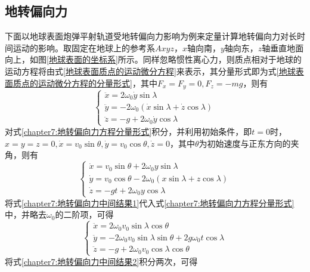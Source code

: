 \subsection{地转偏向力}


下面以地球表面炮弹平射轨道受地转偏向力影响为例来定量计算地转偏向力对长时间运动的影响。取固定在地球上的参考系$Axyz$，$x$轴向南，$y$轴向东，$z$轴垂直地面向上，如图\ref{地球表面的坐标系}所示。同样忽略惯性离心力，则质点相对于地球的运动方程将由式\eqref{地球表面质点的运动微分方程}来表示，其分量形式即为式\eqref{地球表面质点的运动微分方程的分量形式}，其中$F_x=F_y=0, F_z=-mg$，则有
\begin{equation}
\begin{cases}
	\ddot{x} = 2\omega_0\dot{y}\sin\lambda \\
	\ddot{y} = -2\omega_0(\dot{x}\sin\lambda+\dot{z}\cos\lambda) \\
	\ddot{z} = -g+2\omega_0\dot{y}\cos\lambda
\end{cases}
\label{chapter7:地转偏向力方程分量形式}
\end{equation}
对式\eqref{chapter7:地转偏向力方程分量形式}积分，并利用初始条件，即$t=0$时，$x=y=z=0, \dot{x}=v_0\sin\theta, \dot{y}=v_0\cos\theta, \dot{z}=0$，其中$\theta$为初始速度与正东方向的夹角，则有
\begin{equation}
\begin{cases}
	\dot{x} = v_0\sin\theta + 2\omega_0y\sin\lambda \\
	\dot{y} = v_0\cos\theta - 2\omega_0(x\sin\lambda+z\cos\lambda) \\
	\dot{z} = -gt+2\omega_0y\cos\lambda
\end{cases}
\label{chapter7:地转偏向力中间结果1}
\end{equation}
将式\eqref{chapter7:地转偏向力中间结果1}代入式\eqref{chapter7:地转偏向力方程分量形式}中，并略去$\omega_0$的二阶项，可得
\begin{equation}
\begin{cases}
	\ddot{x} = 2\omega_0 v_0 \sin\lambda\cos\theta \\
	\ddot{y} = -2\omega_0v_0 \sin\lambda\sin\theta + 2g\omega_0 t\cos\lambda \\
	\ddot{z} = -g+2\omega_0v_0 \cos\lambda\cos\theta
\end{cases}
\label{chapter7:地转偏向力中间结果2}
\end{equation}
将式\eqref{chapter7:地转偏向力中间结果2}积分两次，可得
